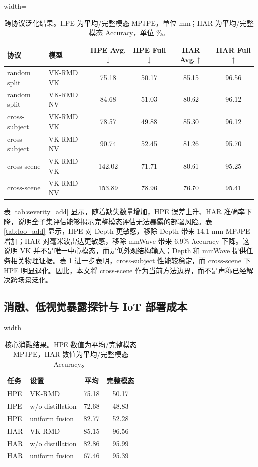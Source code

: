 \documentclass[journal]{IEEEtran}
\begin{document}
\begin{table}[!t]
\centering
\caption{跨协议泛化结果。HPE 为平均/完整模态 MPJPE，单位 mm；HAR 为平均/完整模态 Accuracy，单位 \%。}
\label{tab:protocol_add}
\scriptsize
\begin{adjustbox}{width=\textwidth}
\begin{tabular}{llcccc}
\toprule
协议 & 模型 & HPE Avg.$\downarrow$ & HPE Full$\downarrow$ & HAR Avg.$\uparrow$ & HAR Full$\uparrow$ \\
\midrule
random split & VK-RMD VK & 75.18 & 50.17 & 85.15 & 96.56 \\
random split & VK-RMD NV & 84.68 & 51.03 & 80.62 & 96.12 \\
\midrule
cross-subject & VK-RMD VK & 78.57 & 49.88 & 85.30 & 96.12 \\
cross-subject & VK-RMD NV & 90.74 & 52.45 & 81.26 & 95.70 \\
\midrule
cross-scene & VK-RMD VK & 142.02 & 71.71 & 80.61 & 95.25 \\
cross-scene & VK-RMD NV & 153.89 & 78.96 & 76.70 & 95.41 \\
\bottomrule
\end{tabular}
\end{adjustbox}
\end{table}

表 \ref{tab:severity_add} 显示，随着缺失数量增加，HPE 误差上升、HAR 准确率下降，说明全子集评估能够揭示完整模态评估无法暴露的部署风险。表 \ref{tab:loo_add} 显示，HPE 对 Depth 更敏感，移除 Depth 带来 14.1 mm MPJPE 增加；HAR 对毫米波雷达更敏感，移除 mmWave 带来 6.9\% Accuracy 下降。这说明 VK 并不是唯一中心模态，而是低外观结构输入；Depth 和 mmWave 提供任务相关物理证据。表 \ref{tab:protocol_add} 进一步表明，cross-subject 性能较稳定，而 cross-scene 下 HPE 明显退化。因此，本文将 cross-scene 作为当前方法边界，而不是声称已经解决跨场景泛化。

\subsection{消融、低视觉暴露探针与 IoT 部署成本}

\begin{table}[!t]
\centering
\caption{核心消融结果。HPE 数值为平均/完整模态 MPJPE，HAR 数值为平均/完整模态 Accuracy。}
\label{tab:ablation_add}
\scriptsize
\begin{adjustbox}{width=\linewidth}
\begin{tabular}{llcc}
\toprule
任务 & 设置 & 平均 & 完整模态 \\
\midrule
HPE & VK-RMD & 75.18 & 50.17 \\
HPE & w/o distillation & 72.68 & 48.83 \\
HPE & uniform fusion & 82.77 & 52.28 \\
HAR & VK-RMD & 85.15 & 96.56 \\
HAR & w/o distillation & 82.86 & 95.99 \\
HAR & uniform fusion & 67.46 & 95.39 \\
\bottomrule
\end{tabular}
\end{adjustbox}
\end{table}
\end{document}
